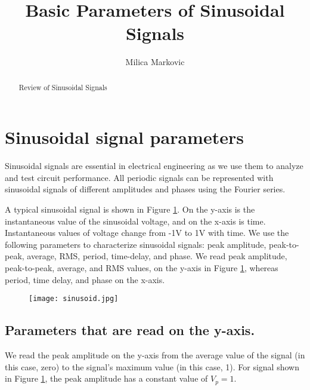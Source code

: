 \documentclass{ximera}
\title{Basic Parameters of Sinusoidal Signals}
\author{Milica Markovic}
\begin{document}
  
\begin{abstract}  
Review of Sinusoidal Signals
\end{abstract}  
\maketitle

\section{Sinusoidal signal parameters}

Sinusoidal signals are essential in electrical engineering as we use them to analyze and test circuit performance. All periodic signals can be represented with sinusoidal signals of different amplitudes and phases using the Fourier series. 

A typical sinusoidal signal is shown in Figure \ref{sinusoid}. On the y-axis is the instantaneous value of the sinusoidal voltage, and on the x-axis is time. Instantaneous values of voltage change from -1V to 1V with time. We use the following parameters to characterize sinusoidal signals: peak amplitude, peak-to-peak, average, RMS, period, time-delay, and phase. We read peak amplitude, peak-to-peak, average, and RMS values, on the y-axis in Figure \ref{sinusoid}, whereas period, time delay, and phase on the x-axis.

\begin{figure}%
\begin{image}
\texttt{[image: sinusoid.jpg]}
\end{image}
\label{sinusoid}
\end{figure}



\subsection{Parameters that are read on the y-axis.}

\begin{definition}
We read the peak amplitude on the y-axis from the average value of the signal (in this case, zero) to the signal's maximum value (in this case, 1). For signal shown in Figure \ref{sinusoid}, the peak  amplitude has a constant value of $V_p=1$. 
\end{definition}
\end{document}
